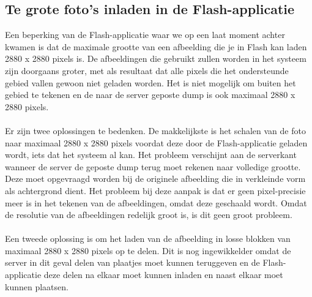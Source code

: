 \subsection{Te grote foto's inladen in de Flash-applicatie} %
Een beperking van de Flash-applicatie waar we op een laat moment achter kwamen is dat de maximale grootte van een afbeelding die je in Flash kan laden 2880 x 2880 pixels is. De afbeeldingen die gebruikt zullen worden in het systeem zijn doorgaans groter, met als resultaat dat alle pixels die het ondersteunde gebied vallen gewoon niet geladen worden. Het is niet mogelijk om buiten het gebied te tekenen en de naar de server geposte dump is ook maximaal 2880 x 2880 pixels.
\\
\\
Er zijn twee oplossingen te bedenken. De makkelijkste is het schalen van de foto naar maximaal 2880 x 2880 pixels voordat deze door de Flash-applicatie geladen wordt, iets dat het systeem al kan. Het probleem verschijnt aan de serverkant wanneer de server de geposte dump terug moet rekenen naar volledige grootte. Deze moet opgevraagd worden bij de originele afbeelding die in verkleinde vorm als achtergrond dient. Het probleem bij deze aanpak is dat er geen pixel-precisie meer is in het tekenen van de afbeeldingen, omdat deze geschaald wordt. Omdat de resolutie van de afbeeldingen redelijk groot is, is dit geen groot probleem.
\\
\\
Een tweede oplossing is om het laden van de afbeelding in losse blokken van maximaal 2880 x 2880 pixels op te delen. Dit is nog ingewikkelder omdat de server in dit geval delen van plaatjes moet kunnen teruggeven en de Flash-applicatie deze delen na elkaar moet kunnen inladen en naast elkaar moet kunnen plaatsen.

